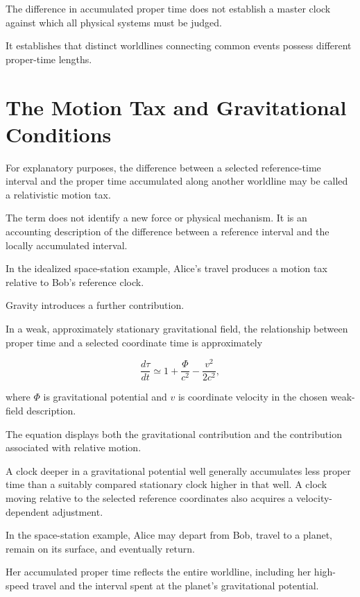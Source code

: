 \documentclass[12pt,onecolumn]{article}
\begin{document}
The difference in accumulated proper time does not establish a master clock against which all physical systems must be judged.

It establishes that distinct worldlines connecting common events possess different proper-time lengths.

\section{The Motion Tax and Gravitational Conditions}

For explanatory purposes, the difference between a selected reference-time interval and the proper time accumulated along another worldline may be called a relativistic motion tax.

The term does not identify a new force or physical mechanism. It is an accounting description of the difference between a reference interval and the locally accumulated interval.

In the idealized space-station example, Alice's travel produces a motion tax relative to Bob's reference clock.

Gravity introduces a further contribution.

In a weak, approximately stationary gravitational field, the relationship between proper time and a selected coordinate time is approximately

\begin{equation}
\frac{d\tau}{dt}\simeq
1+\frac{\Phi}{c^2}-\frac{v^2}{2c^2},
\end{equation}

where \(\Phi\) is gravitational potential and \(v\) is coordinate velocity in the chosen weak-field description.

The equation displays both the gravitational contribution and the contribution associated with relative motion.

A clock deeper in a gravitational potential well generally accumulates less proper time than a suitably compared stationary clock higher in that well. A clock moving relative to the selected reference coordinates also acquires a velocity-dependent adjustment.

In the space-station example, Alice may depart from Bob, travel to a planet, remain on its surface, and eventually return.

Her accumulated proper time reflects the entire worldline, including her high-speed travel and the interval spent at the planet's gravitational potential.
\end{document}
